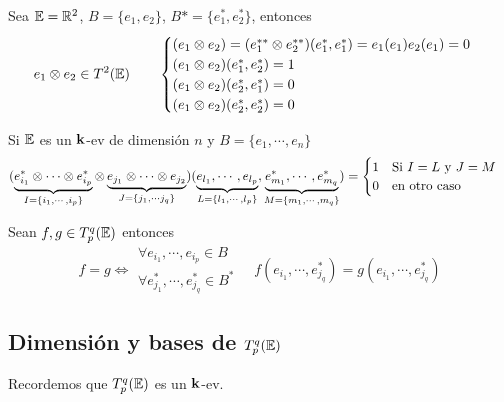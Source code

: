 \begin{example}
	Sea $\mathbb{E} = \mathbb{R}^2$, $B = \{e_1, e_2\}$, $B* = \{e_1^*, e_2^*\}$, entonces
	\[
		e_1 \otimes e_2 \in T^2(\mathbb{E}) \qquad \begin{cases}
			(e_1 \otimes e_2) = (e_1^{**} \otimes e_2^{**})(e_1^*,e_1^*) =
			e_1(e_1)e_2(e_1) = 0 \\
			(e_1 \otimes e_2)(e_1^*,e_2^*) = 1 \\
			(e_1 \otimes e_2)(e_2^*,e_1^*) = 0 \\
			(e_1 \otimes e_2)(e_2^*,e_2^*) = 0
		\end{cases}
	\]
\end{example}
\begin{obs} \label{obs:tens_cero}
	Si $\mathbb{E}$ es un $\mathbf{k}$-ev de dimensión $n$ y $B = \{e_1, \cdots, e_n\}$
	\[
		(\underbrace{e_{i_1}^* \otimes \cdots \otimes e_{i_p}^*}_
		{I = \left\{i_1, \cdots, i_p\right\}} \otimes
		\underbrace{e_{j_1} \otimes \cdots \otimes e_{j_2}}_
		{J = \left\{j_1, \cdots j_q\right\}})(\underbrace{e_{l_1}, \cdots, e_{l_p}}_
		{L = \left\{l_1, \cdots, l_p\right\}}, \underbrace{e_{m_1}^*, \cdots, e_{m_q}^*}_
		{M = \left\{m_1, \cdots, m_q\right\}}) =
		\begin{cases}
			1 \quad \text{Si } I = L \text{ y } J = M \\
			0 \quad \text{en otro caso}
		\end{cases}
	\]
\end{obs}
\begin{obs}
	Sean $f,g \in T_p^q(\mathbb{E})$ entonces
	\[
		f=g \iff \substack{\forall e_{i_1}, \cdots, e_{i_p} \in B \\ \forall e_{j_1}^*, \cdots,
		e_{j_q}^* \in B^*} \quad f(e_{i_1}, \cdots, e_{j_q}^*) =
		g(e_{i_1}, \cdots, e_{j_q}^*)
	\]
\end{obs}

\subsection{Dimensión y bases de $T_p^q(\mathbb{E})$}

Recordemos que $T_p^q(\mathbb{E})$ es un $\mathbf{k}$-ev.

